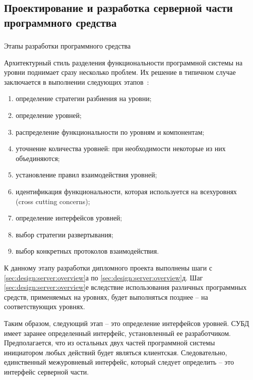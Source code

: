 \subsection{Проектирование и разработка серверной части программного средства}
\label{sec:design:server}

\subsubsection{} Этапы разработки программного средства
\label{sec:design:server:overview}

Архитектурный стиль разделения функциональности программной системы на уровни поднимает сразу несколько проблем.
Их решение в типичном случае заключается в выполнении следующих этапов~\cite{application_architecture_guide}:

\begin{enumerate}
	\item определение стратегии разбиения на уровни;
	\item определение уровней;
	\item распределение функциональности по уровням и компонентам;
	\item уточнение количества уровней: при необходимости некоторые из них объединяются;
	\item установление правил взаимодействия уровней;
	\item идентификация функциональности, которая используется на всех\linebreak уровнях (cross cutting concerns);
	\item определение интерфейсов уровней;
	\item выбор стратегии развертывания;
	\item выбор конкретных протоколов взаимодействия.
\end{enumerate}

К данному этапу разработки дипломного проекта выполнены шаги с \ref{sec:design:server:overview}а по
\ref{sec:design:server:overview}д. Шаг \ref{sec:design:server:overview}е вследствие использования различных
программных средств, применяемых на уровнях, будет выполняться позднее -- на соответствующих уровнях.

Таким образом, следующий этап -- это определение интерфейсов уровней. СУБД имеет заранее определенный интерфейс,
установленный ее разработчиком. Предполагается, что из остальных двух частей программной системы инициатором любых
действий будет являться клиентская. Следовательно, единственный межуровневый интерфейс, который следует определить --
это интерфейс серверной части.

